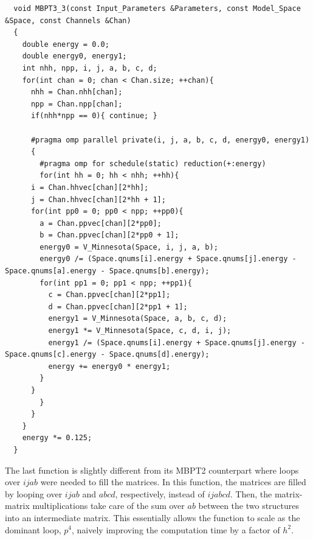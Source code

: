 \begin{lstlisting}
  void MBPT3_3(const Input_Parameters &Parameters, const Model_Space &Space, const Channels &Chan)
  {
    double energy = 0.0;
    double energy0, energy1;
    int nhh, npp, i, j, a, b, c, d;
    for(int chan = 0; chan < Chan.size; ++chan){
      nhh = Chan.nhh[chan];
      npp = Chan.npp[chan];
      if(nhh*npp == 0){ continue; }
      
      #pragma omp parallel private(i, j, a, b, c, d, energy0, energy1)
      {
        #pragma omp for schedule(static) reduction(+:energy)
        for(int hh = 0; hh < nhh; ++hh){
	  i = Chan.hhvec[chan][2*hh];
	  j = Chan.hhvec[chan][2*hh + 1];
	  for(int pp0 = 0; pp0 < npp; ++pp0){
	    a = Chan.ppvec[chan][2*pp0];
	    b = Chan.ppvec[chan][2*pp0 + 1];
	    energy0 = V_Minnesota(Space, i, j, a, b);
	    energy0 /= (Space.qnums[i].energy + Space.qnums[j].energy - Space.qnums[a].energy - Space.qnums[b].energy);
	    for(int pp1 = 0; pp1 < npp; ++pp1){
	      c = Chan.ppvec[chan][2*pp1];
	      d = Chan.ppvec[chan][2*pp1 + 1];
	      energy1 = V_Minnesota(Space, a, b, c, d);
	      energy1 *= V_Minnesota(Space, c, d, i, j);
	      energy1 /= (Space.qnums[i].energy + Space.qnums[j].energy - Space.qnums[c].energy - Space.qnums[d].energy);
	      energy += energy0 * energy1;
	    }
	  }
        }
      }
    }
    energy *= 0.125;
  }
\end{lstlisting}

The last function is slightly different from its MBPT2 counterpart where loops over $ijab$ were needed to fill the matrices. In this function, the matrices are filled by looping over $ijab$ and $abcd$, respectively, instead of $ijabcd$. Then, the matrix-matrix multiplications take care of the sum over $ab$ between the two structures into an intermediate matrix. This essentially allows the function to scale as the dominant loop, $p^4$, naively improving the computation time by a factor of $h^2$.


